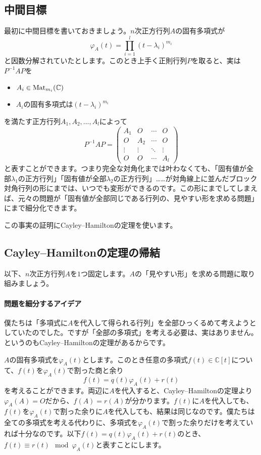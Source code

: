 \subsection{中間目標}

最初に中間目標を書いておきましょう。$n$次正方行列$A$の固有多項式が
\[
\varphi_A(t) = \prod_{i = 1}^{l} (t - \lambda_i)^{m_i}
\]
と因数分解されていたとします。このとき上手く正則行列$P$を取ると、実は$P^{-1} A P$を
\begin{itemize}
\item $A_i \in \operatorname{Mat}_{m_i}(\mathbb{C})$
\item $A_i$の固有多項式は$(t - \lambda_i)^{m_i}$
\end{itemize}
を満たす正方行列$A_1, A_2, \ldots, A_l$によって
\[
P^{-1} A P =
\begin{pmatrix}
A_1 & O & \cdots & O \\
O & A_2 & \cdots & O \\
\vdots & \vdots & \ddots & \vdots \\
O & O & \cdots & A_l
\end{pmatrix}
\]
と表すことができます。つまり完全な対角化までは叶わなくても、「固有値が全部$\lambda_1$の正方行列」「固有値が全部$\lambda_2$の正方行列」……が対角線上に並んだブロック対角行列の形にまでは、いつでも変形ができるのです。この形にまでしてしまえば、元々の問題が「固有値が全部同じである行列の、見やすい形を求める問題」にまで細分化できます。

この事実の証明にCayley--Hamiltonの定理を使います。

\subsection{Cayley--Hamiltonの定理の帰結}

以下、$n$次正方行列$A$を$1$つ固定します。$A$の「見やすい形」を求める問題に取り組みましょう。

\paragraph{問題を細分するアイデア}

僕たちは「多項式に$A$を代入して得られる行列」を全部ひっくるめて考えようとしていたのでした。ですが「全部の多項式」を考える必要は、実はありません。というのもCayley--Hamiltonの定理があるからです。

$A$の固有多項式を$\varphi_A(t)$とします。このとき任意の多項式$f(t) \in \mathbb{C}[t]$について、$f(t)$を$\varphi_A(t)$で割った商と余り
\[
f(t) = q(t) \varphi_A(t) + r(t)
\]
を考えることができます。両辺に$A$を代入すると、Cayley--Hamiltonの定理より$\varphi_A(A) = O$だから、$f(A) = r(A)$が分かります。$f(t)$に$A$を代入しても、$f(t)$を$\varphi_A(t)$で割った余りに$A$を代入しても、結果は同じなのです。僕たちは全ての多項式を考える代わりに、多項式を$\varphi_A(t)$で割った余りだけを考えていれば十分なのです。以下$f(t) = q(t) \varphi_A(t) + r(t)$のとき、$f(t) \equiv r(t) \mod \varphi_A(t)$と表すことにします。

